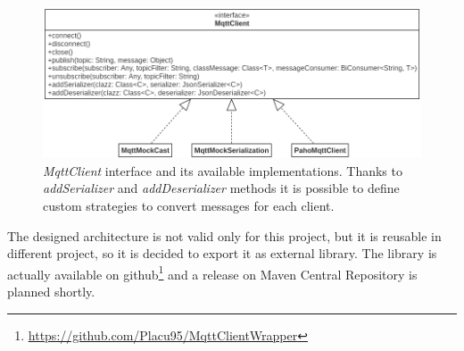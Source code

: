 \begin{figure}[h]
    \centering
    \includegraphics[width=\textwidth]{figures/mqttClient.png}
    \caption[\textit{MqttClient} interface and its available implementations]{\textit{MqttClient} interface and its available implementations. Thanks to \mbox{\textit{addSerializer}} and \mbox{\textit{addDeserializer}} methods it is possible to define custom strategies to convert messages for each client.}
    \label{fig:mqtt}
\end{figure}

\noindent The designed architecture is not valid only for this project, but it is reusable in different project, so it is decided to export it as external library. The library is actually available on github\footnote{\href{https://github.com/Placu95/MqttClientWrapper}{https://github.com/Placu95/MqttClientWrapper}} and a release on Maven Central Repository is planned shortly.

